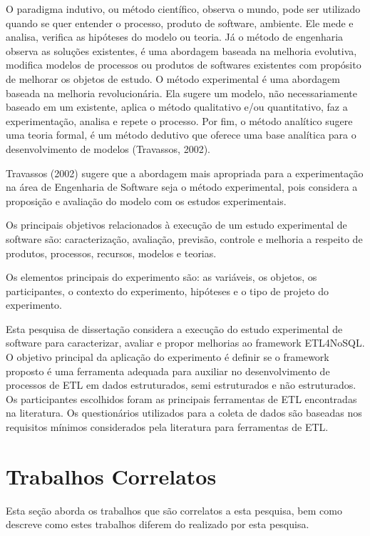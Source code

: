 O paradigma indutivo, ou método científico, observa o mundo, pode ser utilizado quando se quer entender o processo, produto de software, ambiente. Ele mede e analisa, verifica as hipóteses do modelo ou teoria.  Já o método de engenharia observa as soluções existentes, é uma abordagem baseada na melhoria evolutiva, modifica modelos de processos ou produtos de softwares existentes com propósito de melhorar os objetos de estudo. O método experimental é uma abordagem baseada na melhoria revolucionária. Ela sugere um modelo, não necessariamente baseado em um existente, aplica o método qualitativo e/ou quantitativo, faz a experimentação, analisa e repete o processo. Por fim, o método analítico sugere uma teoria formal, é um método dedutivo que oferece uma base analítica para o desenvolvimento de modelos (Travassos, 2002).

Travassos (2002) sugere que a abordagem mais apropriada para a experimentação na área de Engenharia de Software seja o método experimental, pois considera a proposição e avaliação do modelo com os estudos experimentais.

Os principais objetivos relacionados à execução de um estudo experimental de software são: caracterização, avaliação, previsão, controle e melhoria a respeito de produtos, processos, recursos, modelos e teorias.

Os elementos principais do experimento são: as variáveis, os objetos, os participantes, o contexto do experimento, hipóteses e o tipo de projeto do experimento.

Esta pesquisa de dissertação considera a execução do estudo experimental de software para caracterizar, avaliar e propor melhorias ao framework ETL4NoSQL. O objetivo principal da aplicação do experimento é definir se o framework proposto é uma ferramenta adequada para auxiliar no desenvolvimento de processos de ETL em dados estruturados, semi estruturados e não estruturados. Os participantes escolhidos foram as principais ferramentas de ETL encontradas na literatura. Os questionários utilizados para a coleta de dados são baseadas nos requisitos mínimos considerados pela literatura para ferramentas de ETL.


\section{Trabalhos Correlatos}
Esta seção aborda os trabalhos que são correlatos a esta pesquisa, bem como descreve como estes trabalhos diferem do realizado
por esta pesquisa.

